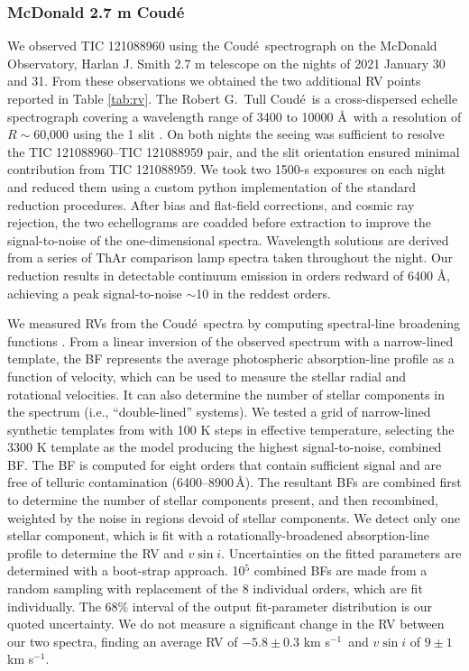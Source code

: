 \documentclass[fleqn,usenatbib]{mnras} %
\newcommand{\kms}{km s$^{-1}$}
\newcommand{\coude}{Coud{\'e}}
\begin{document}
\subsubsection{McDonald 2.7 m Coud{\'e}}
\label{sec:McDonald}

We observed TIC 121088960 using the \coude\ spectrograph on the McDonald Observatory, Harlan J. Smith 2.7 m telescope on the nights of 2021 January 30 and 31. From these observations we obtained the two additional RV points reported in Table \ref{tab:rv}. The Robert G.~Tull \coude\ is a cross-dispersed echelle spectrograph covering a wavelength range of 3400 to 10000 \AA\ with a resolution of $R\sim$60,000 using the 1 slit \citep{Tulletal1995}. On both nights the seeing was sufficient to resolve the TIC 121088960--TIC 121088959 pair, and the slit orientation ensured minimal contribution from TIC 121088959. We took two 1500-s exposures on each night and reduced them using a custom python implementation of the standard reduction procedures. After bias and flat-field corrections, and cosmic ray rejection, the two echellograms are coadded before extraction to improve the signal-to-noise of the one-dimensional spectra. Wavelength solutions are derived from a series of ThAr comparison lamp spectra taken throughout the night. Our reduction results in detectable continuum emission in orders redward of 6400 \AA, achieving a peak signal-to-noise $\sim$10 in the reddest orders.

We measured RVs from the \coude\ spectra by computing spectral-line broadening functions \citep[BFs;][]{Rucinski1992,Tofflemireetal2019}. From a linear inversion of the observed spectrum with a narrow-lined template, the BF represents the average photospheric absorption-line profile as a function of velocity, which can be used to measure the stellar radial and rotational velocities. It can also determine the number of stellar components in the spectrum (i.e., ``double-lined'' systems). We tested a grid of narrow-lined synthetic templates from \citet{Husseretal2013} with 100 K steps in effective temperature, selecting the 3300 K template as the model producing the highest signal-to-noise, combined BF. The BF is computed for eight orders that contain sufficient signal and are free of telluric contamination (6400--8900\,\AA). The resultant BFs are combined first to determine the number of stellar components present, and then recombined, weighted by the noise in regions devoid of stellar components. We detect only one stellar component, which is fit with a rotationally-broadened absorption-line profile \citep{gray_book} to determine the RV and $v \sin i$. Uncertainties on the fitted parameters are determined with a boot-strap approach. 10$^5$ combined BFs are made from a random sampling with replacement of the 8 individual orders, which are fit individually. The 68\% interval of the output fit-parameter distribution is our quoted uncertainty. We do not measure a significant change in the RV between our two spectra, finding an average RV of $-5.8 \pm 0.3$ \kms\ and $v \sin i$ of $9 \pm1$ \kms.
\end{document}
